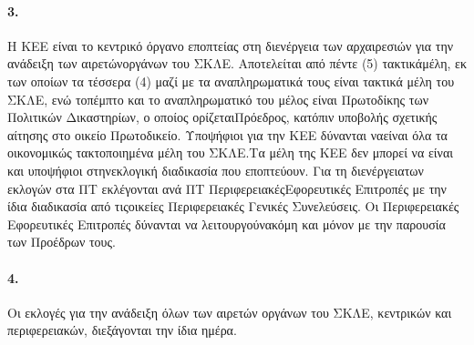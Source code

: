 \documentclass[a4paper,oneside, 10pt]{book}
\begin{document}
\paragraph { 3. } Η ΚΕΕ είναι το κεντρικό όργανο εποπτείας στη διενέργεια των αρχαιρεσιών για την ανάδειξη των αιρετώνοργάνων του ΣΚΛΕ. Αποτελείται από πέντε (5) τακτικάμέλη, εκ των οποίων τα τέσσερα (4) μαζί με τα αναπληρωματικά τους είναι τακτικά μέλη του ΣΚΛΕ, ενώ τοπέμπτο και το αναπληρωματικό του μέλος είναι Πρωτοδίκης των Πολιτικών Δικαστηρίων, ο οποίος ορίζεταιΠρόεδρος, κατόπιν υποβολής σχετικής αίτησης στο οικείο Πρωτοδικείο. Υποψήφιοι για την ΚΕΕ δύνανται ναείναι όλα τα οικονομικώς τακτοποιημένα μέλη του ΣΚΛΕ.Τα μέλη της ΚΕΕ δεν μπορεί να είναι και υποψήφιοι στηνεκλογική διαδικασία που εποπτεύουν. Για τη διενέργειατων εκλογών στα ΠΤ εκλέγονται ανά ΠΤ ΠεριφερειακέςΕφορευτικές Επιτροπές με την ίδια διαδικασία από τιςοικείες Περιφερειακές Γενικές Συνελεύσεις. Οι Περιφερειακές Εφορευτικές Επιτροπές δύνανται να λειτουργούνακόμη και μόνον με την παρουσία των Προέδρων τους.
\paragraph { 4. } Οι εκλογές για την ανάδειξη όλων των αιρετών οργάνων του ΣΚΛΕ, κεντρικών και περιφερειακών, διεξάγονται την ίδια ημέρα.
\end{document}
